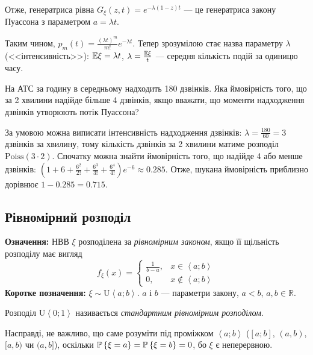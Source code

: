 Отже, генератриса рівна $G_\xi(z, t) = e^{-\lambda(1-z)t}$ --- це генератриса закону Пуассона з параметром $a=\lambda t$.

Таким чином, $p_m(t) = \frac{(\lambda t)^m}{m!}e^{-\lambda t}$. 
Тепер зрозумілою стає назва параметру $\lambda$ (<<інтенсивність>>): $\E\xi = \lambda t$, $\lambda = \frac{\E\xi}{t}$ --- середня кількість подій за одиницю часу.

\begin{example}
    На АТС за годину в середньому надходить 180 дзвінків. Яка ймовірність того,
    що за 2 хвилини надійде більше 4 дзвінків, якщо вважати, що моменти надходження дзвінків
    утворюють потік Пуассона?

    За умовою можна виписати інтенсивність надходження дзвінків: $\lambda = \frac{180}{60} = 3$ дзвінків за хвилину,
    тому кількість дзвінків за 2 хвилини матиме розподіл $\mathrm{Poiss}(3\cdot 2)$.
    Спочатку можна знайти ймовірність того, що надійде 4 або менше дзвінків:
    $\left(1 + 6 + \frac{6^2}{2!} + \frac{6^3}{3!} + \frac{6^4}{4!}\right)e^{-6} \approx 0.285$.
    Отже, шукана ймовірність приблизно дорівнює $1 - 0.285 = 0.715$.

\end{example}

\subsection{Рівномірний розподіл}
\noindent\textbf{Означення:}
    НВВ $\xi$ розподілена за \emph{рівномірним законом}, 
    якщо її щільність розподілу має вигляд \begin{equation}
        f_\xi(x) = \begin{cases}
            \frac{1}{b-a}, & x \in \left<a; b\right> \\
            0, & x \notin \left<a; b\right>
        \end{cases}
    \end{equation}
\textbf{Коротке позначення:} $\xi \sim \mathrm{U}\left<a; b\right>$.
    $a$ і $b$ --- параметри закону, $a<b$, $a, b \in \mathbb{R}$.

Розподіл $\mathrm{U}\left<0; 1\right>$ називається \emph{стандартним рівномірним розподілом}.

\begin{remark}
    Насправді, не важливо, що саме розуміти під проміжком $\left<a; b\right>$
    ($[a; b]$, $(a, b)$, $[a, b)$ чи $(a, b]$), оскільки $\P\left\{\xi = a \right\} = \P\left\{\xi = b \right\} = 0$,
    бо $\xi$ є неперервною.
\end{remark}

